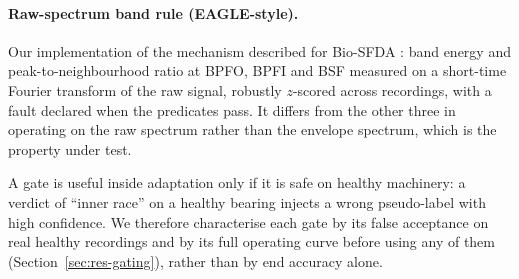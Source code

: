 \paragraph{Raw-spectrum band rule (EAGLE-style).} Our implementation of the mechanism described for Bio-SFDA
\cite{yoon2026biosfda}: band energy and peak-to-neighbourhood ratio at BPFO, BPFI and BSF measured on a short-time Fourier
transform of the raw signal, robustly $z$-scored across recordings, with a fault declared when the predicates pass. It
differs from the other three in operating on the raw spectrum rather than the envelope spectrum, which is the property under
test.

A gate is useful inside adaptation only if it is safe on healthy machinery: a verdict of ``inner race'' on a healthy bearing
injects a wrong pseudo-label with high confidence. We therefore characterise each gate by its false acceptance on real
healthy recordings and by its full operating curve before using any of them (Section~\ref{sec:res-gating}), rather than by
end accuracy alone.
